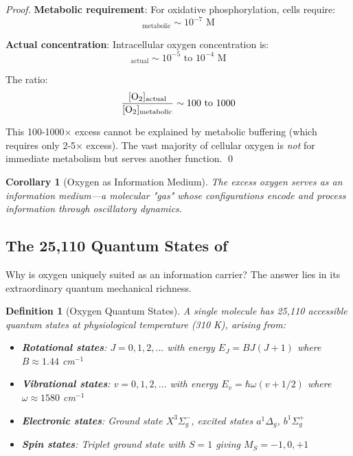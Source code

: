 \documentclass[12pt,a4paper]{article}
\newtheorem{corollary}{Corollary}
\newtheorem{definition}{Definition}
\begin{document}
\begin{proof}
\textbf{Metabolic requirement}: For oxidative phosphorylation, cells require:
\begin{equation}
[\ce{O2}]_{\text{metabolic}} \sim 10^{-7} \text{ M}
\end{equation}

\textbf{Actual concentration}: Intracellular oxygen concentration is:
\begin{equation}
[\ce{O2}]_{\text{actual}} \sim 10^{-5} \text{ to } 10^{-4} \text{ M}
\end{equation}

The ratio:
\begin{equation}
\frac{[\ce{O2}]_{\text{actual}}}{[\ce{O2}]_{\text{metabolic}}} \sim 100 \text{ to } 1000
\end{equation}

This 100-1000× excess cannot be explained by metabolic buffering (which requires only 2-5× excess). The vast majority of cellular oxygen is \textit{not} for immediate metabolism but serves another function. \qed
\end{proof}

\begin{corollary}[Oxygen as Information Medium]
\label{cor:oxygen_information}
The excess oxygen serves as an information medium—a molecular "gas" whose configurations encode and process information through oscillatory dynamics.
\end{corollary}

\subsection{The 25,110 Quantum States of }

Why is oxygen uniquely suited as an information carrier? The answer lies in its extraordinary quantum mechanical richness.

\begin{definition}[Oxygen Quantum States]
\label{def:oxygen_states}
A single  molecule has 25,110 accessible quantum states at physiological temperature (310 K), arising from:
\begin{itemize}
\item \textbf{Rotational states}: $J = 0, 1, 2, \ldots$ with energy $E_J = B J(J+1)$ where $B \approx 1.44$ cm$^{-1}$
\item \textbf{Vibrational states}: $v = 0, 1, 2, \ldots$ with energy $E_v = \hbar\omega(v + 1/2)$ where $\omega \approx 1580$ cm$^{-1}$
\item \textbf{Electronic states}: Ground state $X^3\Sigma_g^-$, excited states $a^1\Delta_g$, $b^1\Sigma_g^+$
\item \textbf{Spin states}: Triplet ground state with $S = 1$ giving $M_S = -1, 0, +1$
\end{itemize}
\end{definition}
\end{document}
